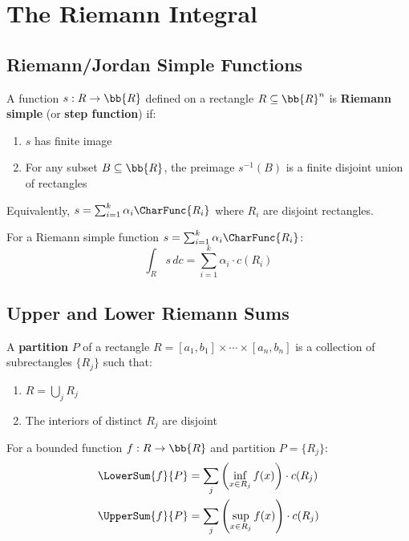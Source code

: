 \chapter{The Riemann Integral}

\section{Riemann/Jordan Simple Functions}

\begin{definition}
A function $s: R \to \bb{R}$ defined on a rectangle $R \subseteq \bb{R}^n$ is \textbf{Riemann simple} (or \textbf{step function}) if:
\begin{enumerate}
    \item $s$ has finite image
    \item For any subset $B \subseteq \bb{R}$, the preimage $s^{-1}(B)$ is a finite disjoint union of rectangles
\end{enumerate}
Equivalently, $s = \sum_{i=1}^k \alpha_i \CharFunc{R_i}$ where $R_i$ are disjoint rectangles.
\end{definition}

\begin{definition}
For a Riemann simple function $s = \sum_{i=1}^k \alpha_i \CharFunc{R_i}$:
\[ \int_R s \, dc = \sum_{i=1}^k \alpha_i \cdot c(R_i) \]
\end{definition}

\section{Upper and Lower Riemann Sums}

\begin{definition}[Partition]
A \textbf{partition} $P$ of a rectangle $R = [a_1, b_1] \times \cdots \times [a_n, b_n]$ is a collection of subrectangles $\{R_j\}$ such that:
\begin{enumerate}
    \item $R = \bigcup_j R_j$
    \item The interiors of distinct $R_j$ are disjoint
\end{enumerate}
\end{definition}

\begin{definition}
For a bounded function $f: R \to \bb{R}$ and partition $P = \{R_j\}$:
\begin{align*}
    \LowerSum{f}{P} &= \sum_j \left(\inf_{x \in R_j} f(x)\right) \cdot c(R_j) \\
    \UpperSum{f}{P} &= \sum_j \left(\sup_{x \in R_j} f(x)\right) \cdot c(R_j)
\end{align*}
\end{definition}

